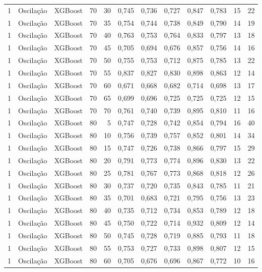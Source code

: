 \begin{longtable}{@{}rllrrrrrrrrr@{}}
1 & Oscilação & XGBoost & 70 & 30 & 0,745 & 0,736 & 0,727 & 0,847 & 0,783 & 15 & 22 \\
1 & Oscilação & XGBoost & 70 & 35 & 0,754 & 0,744 & 0,738 & 0,849 & 0,790 & 14 & 19 \\
1 & Oscilação & XGBoost & 70 & 40 & 0,763 & 0,753 & 0,764 & 0,833 & 0,797 & 13 & 18 \\
1 & Oscilação & XGBoost & 70 & 45 & 0,705 & 0,694 & 0,676 & 0,857 & 0,756 & 14 & 16 \\
1 & Oscilação & XGBoost & 70 & 50 & 0,755 & 0,753 & 0,712 & 0,875 & 0,785 & 13 & 22 \\
1 & Oscilação & XGBoost & 70 & 55 & 0,837 & 0,827 & 0,830 & 0,898 & 0,863 & 12 & 14 \\
1 & Oscilação & XGBoost & 70 & 60 & 0,671 & 0,668 & 0,682 & 0,714 & 0,698 & 13 & 17 \\
1 & Oscilação & XGBoost & 70 & 65 & 0,699 & 0,696 & 0,725 & 0,725 & 0,725 & 12 & 15 \\
1 & Oscilação & XGBoost & 70 & 70 & 0,761 & 0,740 & 0,739 & 0,895 & 0,810 & 11 & 16 \\
1 & Oscilação & XGBoost & 80 & 5 & 0,747 & 0,728 & 0,742 & 0,854 & 0,794 & 16 & 40 \\
1 & Oscilação & XGBoost & 80 & 10 & 0,756 & 0,739 & 0,757 & 0,852 & 0,801 & 14 & 34 \\
1 & Oscilação & XGBoost & 80 & 15 & 0,747 & 0,726 & 0,738 & 0,866 & 0,797 & 15 & 29 \\
1 & Oscilação & XGBoost & 80 & 20 & 0,791 & 0,773 & 0,774 & 0,896 & 0,830 & 13 & 22 \\
1 & Oscilação & XGBoost & 80 & 25 & 0,781 & 0,767 & 0,773 & 0,868 & 0,818 & 12 & 26 \\
1 & Oscilação & XGBoost & 80 & 30 & 0,737 & 0,720 & 0,735 & 0,843 & 0,785 & 11 & 21 \\
1 & Oscilação & XGBoost & 80 & 35 & 0,701 & 0,683 & 0,721 & 0,795 & 0,756 & 13 & 23 \\
1 & Oscilação & XGBoost & 80 & 40 & 0,735 & 0,712 & 0,734 & 0,853 & 0,789 & 12 & 18 \\
1 & Oscilação & XGBoost & 80 & 45 & 0,750 & 0,722 & 0,714 & 0,932 & 0,809 & 12 & 14 \\
1 & Oscilação & XGBoost & 80 & 50 & 0,745 & 0,728 & 0,719 & 0,885 & 0,793 & 11 & 18 \\
1 & Oscilação & XGBoost & 80 & 55 & 0,753 & 0,727 & 0,733 & 0,898 & 0,807 & 12 & 15 \\
1 & Oscilação & XGBoost & 80 & 60 & 0,705 & 0,676 & 0,696 & 0,867 & 0,772 & 10 & 16 \\

\end{longtable}
